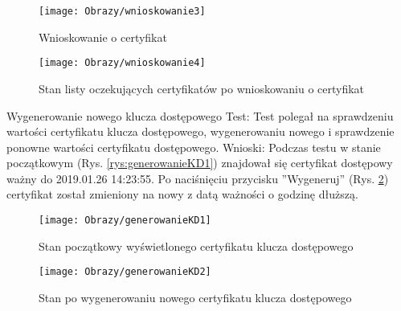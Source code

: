 \begin{enumerate*}
\begin{figure}[ht!]
		\begin{minipage}{0.3\textwidth}
		\texttt{[image: Obrazy/wnioskowanie3]}
		\caption{Wnioskowanie o certyfikat}
		\label{rys:wnioskowanie3}
	\end{minipage}
\hspace{0.01\textwidth}
	\begin{minipage}{0.3\textwidth}
		\texttt{[image: Obrazy/wnioskowanie4]}
		\caption{Stan listy oczekujących certyfikatów po wnioskowaniu o certyfikat}
		\label{rys:wnioskowanie4}
	\end{minipage}
	\end{figure}
\newpage
	\item Wygenerowanie nowego klucza dostępowego\newline
	Test: Test polegał na sprawdzeniu wartości certyfikatu klucza dostępowego, wygenerowaniu nowego i sprawdzenie ponowne wartości certyfikatu dostępowego.\newline
	Wnioski: Podczas testu w stanie początkowym (Rys. \ref{rys:generowanieKD1}) znajdował się certyfikat dostępowy ważny do 2019.01.26 14:23:55. Po naciśnięciu przycisku ''Wygeneruj'' (Rys. \ref{rys:generowanieKD2}) certyfikat został zmieniony na nowy z datą ważności o godzinę dłuższą.	
	\begin{figure}[ht!]
		\centering
		\begin{minipage}{0.3\textwidth}
			\texttt{[image: Obrazy/generowanieKD1]}
			\caption{Stan początkowy wyświetlonego certyfikatu klucza dostępowego }
			\label{rys:generowanieKD1}
		\end{minipage}
	\hspace{0.01\textwidth}
		\begin{minipage}{0.3\textwidth}
			\texttt{[image: Obrazy/generowanieKD2]}
			\caption{Stan po wygenerowaniu nowego certyfikatu klucza dostępowego}
			\label{rys:generowanieKD2}
		\end{minipage}
	\end{figure}
	

\end{enumerate*}
